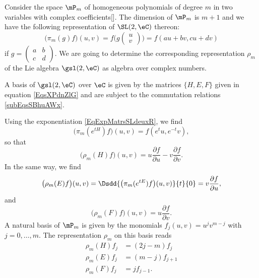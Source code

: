 Consider the space $\mP_m$ of homogeneous polynomials of degree $m$ in two variables with complex coefficients[\cite{GpAlgLie_Faraut}]. The dimension of $\mP_m$ is $m+1$ and we have the following representation of $\SL(2,\eC)$ thereon:
\begin{equation}
    \big( \pi_m(g)f \big)(u,v)=f\big(
g
\begin{pmatrix}
u\\v
\end{pmatrix}
 \big)
=
f(au+bv,cu+dv)
\end{equation}
if $g=\begin{pmatrix}
  a &   b   \\
  c &   d
\end{pmatrix}$. We are going to determine the corresponding representation $\rho_m$ of the Lie algebra $\gsl(2,\eC)$ as algebra over complex numbers.

A basis of $\gsl(2,\eC)$ over $\eC$ is given by the matrices $\{ H,E,F \}$ given in equation \eqref{EqsXPdnZlG} and are subject to the commutation relations \eqref{subEqsSBhuAWx}.




Using the exponentiation \eqref{EqExpMatrsSLdeuxR}, we find
\[
    \big( \pi_m( e^{tH})f \big)(u,v)=f( e^{t}u, e^{-t}v),
\]
so that
\begin{equation}
    \big( \rho_m(H)f \big)(u,v)=u\frac{ \partial f }{ \partial u }-v\frac{ \partial f }{ \partial v }.
\end{equation}
In the same way, we find
\begin{equation}
    \big( \rho_m(E)f \big)(u,v)=\Dsdd{ \big( \pi_m( e^{tE})f \big)(u,v) }{t}{0}=v\frac{ \partial f }{ \partial u },
\end{equation}
and
\begin{equation}
     \big( \rho_m(F)f \big)(u,v)=u \frac{ \partial f }{ \partial v }.
\end{equation}
A natural basis of $\mP_m$ is given by the monomials $f_j(u,v)=u^jv^{m-j}$ with $j=0,\ldots,m$. The representation $\rho_m$ on this basis reads
\begin{equation}        \label{EqReprezgsldeuxC}
\begin{split}
    \rho_m(H)f_j&=(2j-m)f_j\\
    \rho_m(E)f_j&=(m-j)f_{j+1}\\
    \rho_m(F)f_j&=jf_{j-1}.
\end{split}
\end{equation}

